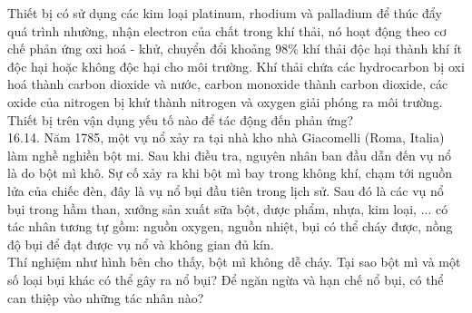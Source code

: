 \documentclass[10pt]{article}
\begin{document}
Thiết bị có sử dụng các kim loại platinum, rhodium và palladium để thúc đẩy quá trình nhường, nhận electron của chất trong khí thải, nó hoạt động theo cơ chế phản ứng oxi hoá - khử, chuyển đổi khoảng $98 \%$ khí thải độc hại thành khí ít độc hại hoặc không độc hại cho môi trường. Khí thải chứa các hydrocarbon bị oxi hoá thành carbon dioxide và nước, carbon monoxide thành carbon dioxide, các oxide của nitrogen bị khử thành nitrogen và oxygen giải phóng ra môi trường.\\
Thiết bị trên vận dụng yếu tố nào để tác động đến phản ứng?\\
16.14. Năm 1785, một vụ nổ xảy ra tại nhà kho nhà Giacomelli (Roma, Italia) làm nghề nghiền bột mi. Sau khi điều tra, nguyên nhân ban đầu dẫn đến vụ nổ là do bột mì khô. Sự cố xảy ra khi bột mì bay trong không khí, chạm tới nguồn lửa của chiếc đèn, đây là vụ nổ bụi đầu tiên trong lịch sử. Sau đó là các vụ nổ bụi trong hầm than, xưởng sản xuất sữa bột, dược phẩm, nhựa, kim loại, ... có tác nhân tương tự gồm: nguồn oxygen, nguồn nhiệt, bụi có thể cháy được, nồng độ bụi để đạt được vụ nổ và không gian đủ kín.\\
Thí nghiệm như hình bên cho thấy, bột mì không dễ cháy. Tại sao bột mì và một số loại bụi khác có thể gây ra nổ bụi? Để ngăn ngừa và hạn chế nổ bụi, có thể can thiệp vào những tác nhân nào?\\
\end{document}
